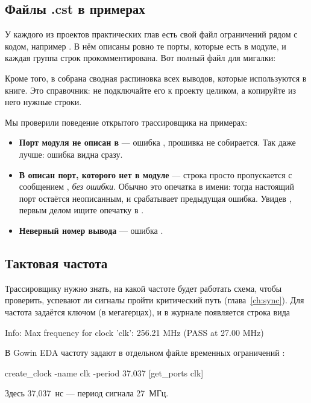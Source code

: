 \subsection{Файлы .cst в примерах}

У каждого из проектов практических глав есть свой файл ограничений
рядом с кодом, например . В нём описаны ровно
те порты, которые есть в модуле, и каждая группа строк прокомментирована.
Вот полный файл для мигалки:


Кроме того, в  собрана сводная
распиновка всех выводов, которые используются в книге. Это справочник: не
подключайте его к проекту целиком, а копируйте из него нужные строки.

\begin{warnbox}
Мы проверили поведение открытого трассировщика  на примерах:
\begin{itemize}
  \item \textbf{Порт модуля не описан в } --- ошибка
        , прошивка не собирается. Так даже лучше: ошибка
        видна сразу.
  \item \textbf{В  описан порт, которого нет в модуле} --- строка
        просто пропускается с сообщением , \emph{без
        ошибки}. Обычно это опечатка в имени: тогда настоящий порт остаётся
        неописанным, и срабатывает предыдущая ошибка. Увидев
        , первым делом ищите опечатку в .
  \item \textbf{Неверный номер вывода} --- ошибка .
\end{itemize}
\end{warnbox}

\subsection{Тактовая частота}

Трассировщику нужно знать, на какой частоте будет работать схема, чтобы
проверить, успевают ли сигналы пройти критический путь
(глава~\ref{ch:sync}). Для  частота задаётся ключом
 (в мегагерцах), и в журнале появляется строка вида
\begin{vcode}[text]
Info: Max frequency for clock 'clk': 256.21 MHz (PASS at 27.00 MHz)
\end{vcode}
В Gowin EDA частоту задают в отдельном файле временных ограничений :
\begin{vcode}[text]
create_clock -name clk -period 37.037 [get_ports {clk}]
\end{vcode}
Здесь 37,037~нс --- период сигнала 27~МГц.

